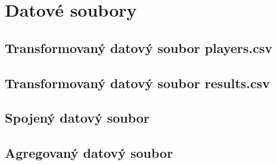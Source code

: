 \chapter{Datové soubory}
\section{Transformovaný datový soubor players.csv}


\section{Transformovaný datový soubor results.csv}


\section{Spojený datový soubor}


\section{Agregovaný datový soubor}
